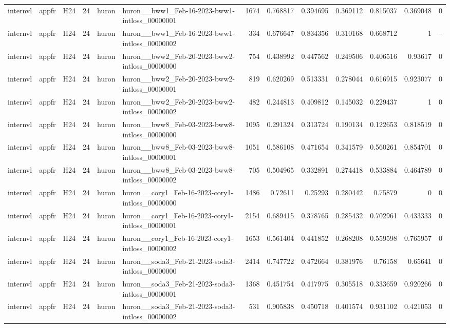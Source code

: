 \begin{longtable}{lllrllrrrrrrr}
internvl & appfr & H24 & 24 & huron & huron\_\_bww1\_Feb-16-2023-bww1-intloss\_00000001 & 1674 & 0.768817 & 0.394695 & 0.369112 & 0.815037 & 0.369048 & 0 \\
internvl & appfr & H24 & 24 & huron & huron\_\_bww1\_Feb-16-2023-bww1-intloss\_00000002 & 334 & 0.676647 & 0.834356 & 0.310168 & 0.668712 & 1 & -- \\
internvl & appfr & H24 & 24 & huron & huron\_\_bww2\_Feb-20-2023-bww2-intloss\_00000000 & 754 & 0.438992 & 0.447562 & 0.249506 & 0.406516 & 0.93617 & 0 \\
internvl & appfr & H24 & 24 & huron & huron\_\_bww2\_Feb-20-2023-bww2-intloss\_00000001 & 819 & 0.620269 & 0.513331 & 0.278044 & 0.616915 & 0.923077 & 0 \\
internvl & appfr & H24 & 24 & huron & huron\_\_bww2\_Feb-20-2023-bww2-intloss\_00000002 & 482 & 0.244813 & 0.409812 & 0.145032 & 0.229437 & 1 & 0 \\
internvl & appfr & H24 & 24 & huron & huron\_\_bww8\_Feb-03-2023-bww8-intloss\_00000000 & 1095 & 0.291324 & 0.313724 & 0.190134 & 0.122653 & 0.818519 & 0 \\
internvl & appfr & H24 & 24 & huron & huron\_\_bww8\_Feb-03-2023-bww8-intloss\_00000001 & 1051 & 0.586108 & 0.471654 & 0.341579 & 0.560261 & 0.854701 & 0 \\
internvl & appfr & H24 & 24 & huron & huron\_\_bww8\_Feb-03-2023-bww8-intloss\_00000002 & 705 & 0.504965 & 0.332891 & 0.274418 & 0.533884 & 0.464789 & 0 \\
internvl & appfr & H24 & 24 & huron & huron\_\_cory1\_Feb-16-2023-cory1-intloss\_00000000 & 1486 & 0.72611 & 0.25293 & 0.280442 & 0.75879 & 0 & 0 \\
internvl & appfr & H24 & 24 & huron & huron\_\_cory1\_Feb-16-2023-cory1-intloss\_00000001 & 2154 & 0.689415 & 0.378765 & 0.285432 & 0.702961 & 0.433333 & 0 \\
internvl & appfr & H24 & 24 & huron & huron\_\_cory1\_Feb-16-2023-cory1-intloss\_00000002 & 1653 & 0.561404 & 0.441852 & 0.268208 & 0.559598 & 0.765957 & 0 \\
internvl & appfr & H24 & 24 & huron & huron\_\_soda3\_Feb-21-2023-soda3-intloss\_00000000 & 2414 & 0.747722 & 0.472664 & 0.381976 & 0.76158 & 0.65641 & 0 \\
internvl & appfr & H24 & 24 & huron & huron\_\_soda3\_Feb-21-2023-soda3-intloss\_00000001 & 1368 & 0.451754 & 0.417975 & 0.305518 & 0.333659 & 0.920266 & 0 \\
internvl & appfr & H24 & 24 & huron & huron\_\_soda3\_Feb-21-2023-soda3-intloss\_00000002 & 531 & 0.905838 & 0.450718 & 0.401574 & 0.931102 & 0.421053 & 0 \\

\end{longtable}
